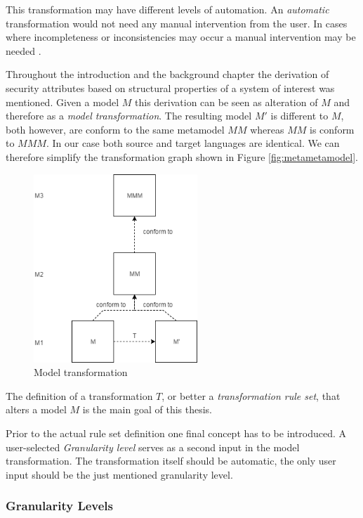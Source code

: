 This transformation may have different levels of automation. An \textit{automatic} transformation would not need any manual intervention from the user. In cases where incompleteness or inconsistencies may occur a manual intervention may be needed \cite{mt_taxonomy}.

Throughout the introduction and the background chapter the derivation of security attributes based on structural properties of a system of interest was mentioned. Given a model $M$ this derivation can be seen as alteration of $M$ and therefore as a \textit{model transformation}. The resulting model $M'$ is different to $M$, both however, are conform to the same metamodel $MM$ whereas $MM$ is conform to $MMM$. In our case both source and target languages are identical. We can therefore simplify the transformation graph shown in Figure \ref{fig:metametamodel}.

\begin{figure}[H]
\centering
\includegraphics[width=0.55\textwidth]{pictures/transformation.png}
\caption{Model transformation}
\label{fig:transformation}
\end{figure}

The definition of a transformation $T$, or better a \textit{transformation rule set}, that alters a model $M$ is the main goal of this thesis.

Prior to the actual rule set definition one final concept has to be introduced. A user-selected \textit{Granularity level} serves as a second input in the model transformation. The transformation itself should be automatic, the only user input should be the just mentioned granularity level.

\subsubsection{Granularity Levels}
\label{subsubsec:granularity}


